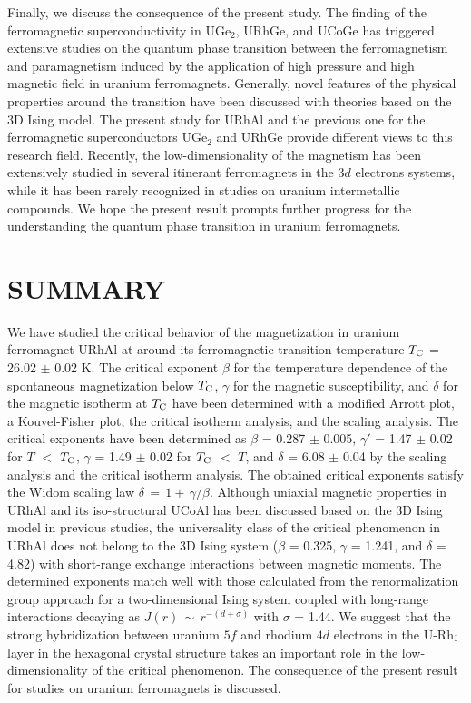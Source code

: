 \documentclass[twocolumn,showpacs,preprintnumbers,amsmath,amssymb]{revtex4}
\begin{document}
Finally, we discuss the consequence of the present study. The finding of the ferromagnetic superconductivity in UGe$_2$, URhGe, and UCoGe has triggered extensive studies on the quantum phase transition between the ferromagnetism and paramagnetism induced by the application of high pressure and high magnetic field in uranium ferromagnets. Generally, novel features of the physical properties around the transition have been discussed with theories based on the 3D Ising model. The present study for URhAl and the previous one for the ferromagnetic superconductors UGe$_2$ and URhGe provide different views to this research field. Recently, the low-dimensionality of the magnetism has been extensively studied in several itinerant ferromagnets in the $3d$ electrons systems\cite{bhattacharyya,han,liu,liu2,lin,liu3}, while it has been rarely recognized in studies on uranium intermetallic compounds. We hope the present result prompts further progress for the understanding the quantum phase transition in uranium ferromagnets. 

 

  
\section{SUMMARY}
We have studied the critical behavior of the magnetization in uranium ferromagnet URhAl at around its ferromagnetic transition temperature $T_{\rm C}$ = 26.02 $\pm$ 0.02 K. The critical exponent $\beta$ for the temperature dependence of the spontaneous magnetization below $T_{\rm C}$, $\gamma$ for the magnetic susceptibility, and $\delta$ for the magnetic isotherm at $T_{\rm C}$ have been determined with a modified Arrott plot, a Kouvel-Fisher plot, the critical isotherm analysis, and the scaling analysis. The critical exponents have been determined as $\beta$ = 0.287 $\pm$ 0.005, ${\gamma}'$ = 1.47 $\pm$ 0.02 for $T$ $<$ $T_{\rm C}$, $\gamma$ = 1.49 $\pm$ 0.02 for $T_{\rm C}$ $<$ $T$, and $\delta$ = 6.08 $\pm$ 0.04 by the scaling analysis and the critical isotherm analysis. The obtained critical exponents satisfy the Widom scaling law ${\delta}{\,}={\,}1+{\,}{\gamma}/{\beta}$. Although uniaxial magnetic properties in URhAl and its iso-structural UCoAl has been discussed based on the 3D Ising model in previous studies, the universality class of the critical phenomenon in URhAl does not belong to the 3D Ising system ($\beta$ = 0.325, $\gamma$ = 1.241, and $\delta$ = 4.82) with short-range exchange interactions between magnetic moments. The determined exponents match well with those calculated from the renormalization group approach for a two-dimensional Ising system coupled with long-range interactions decaying as $J(r){\,}{\sim}{\,}r^{-(d+{\sigma})}$ with $\sigma$ = 1.44. We suggest that the strong hybridization between uranium $5f$ and rhodium $4d$ electrons in the U-Rh$_{\rm I}$ layer in the hexagonal crystal structure takes an important role in the low-dimensionality of the critical phenomenon. The consequence of the present result for studies on uranium ferromagnets is discussed. 
 
\end{document}

